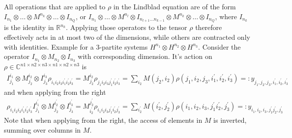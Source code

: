 \documentclass[letterpaper]{article}
\newcommand{\R}{\mathds{R}}
\newcommand{\C}{\mathds{C}}
\begin{document}
All operations that are applied to $\rho$ in the Lindblad equation are of the form $I_{n_1}\otimes \dots \otimes M^{n_k} \otimes \dots \otimes I_{n_Q}$, or $I_{n_1}\otimes \dots \otimes M^{n_l} \otimes I_{n_{l+1}\dots n_{k-1}} \otimes M^{n_k} \otimes \dots \otimes I_{n_Q}$, where $I_{n_k}$ is the identity in $\R^{n_k}$. Applying those operators to the tensor $\rho$ therefore effectively acts in at most two of the dimensions, while others are contracted only with identities. Example for a 3-partite systems $H^{n_1} \otimes H^{n_2} \otimes H^{n_3}$. Consider the operator $I_{n_1} \otimes M_{n_2} \otimes I_{n_3}$ with corresponding dimension. It's action on $\rho \in \C^{n1\times n2\times n3 \times n1\times n2 \times n3}$ is
\begin{align}
    I^{i_1}_{j_1}\otimes M^{i_2}_{j_2} \otimes I^{i_3}_{j_3} \rho_{i_1i_2i_3i_1^{\prime}i_2^\prime i_3^\prime} = M^{i_2}_{j_2} \rho_{j_1i_2i_3j_1^{\prime}i_2^\prime i_3^\prime} = \sum_{i_2} M(j_2, i_2) \rho(j_1,i_2,j_3,i_1^{\prime},i_2^\prime, i_3^\prime)  =: y_{j_1,j_2,j_3,i_1^{\prime},i_2^\prime,i_3^\prime}
\end{align}
and when applying from the right
\begin{align}
    \rho_{i_1i_2i_3i_1^{\prime}i_2^\prime i_3^\prime}I^{i_1^{\prime}}_{j_1}\otimes M^{i_2^\prime}_{j_2} \otimes I^{i_3^\prime}_{j_3}  = M^{j_2^\prime}_{i_2^\prime} \rho_{i_1i_2i_3j_1^{\prime}i_2^\prime j_3^\prime} = \sum_{i_2^\prime} M(i_2^{\prime}, j_2^\prime) \rho(i_1,i_2,i_3,j_1^{\prime}i_2^\prime, j_3^\prime)  =: y_{i_1,i_2,i_3,j_1^{\prime}j_2^\prime, j_3^\prime}
\end{align}
Note that when applying from the right, the access of elements in $M$ is inverted, summing over columns in $M$.
\end{document}
